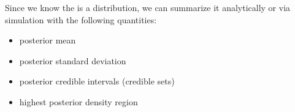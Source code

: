 \documentclass{beamer}
\begin{document}
\begin{frame}
Since we know the  is a 
distribution, we can summarize it analytically or via simulation with
the following quantities:
\pause
\bigskip
\begin{itemize}
\item posterior mean
\pause
\item posterior standard deviation
\pause 
\item posterior credible intervals (credible sets)
\pause
\item highest posterior density region
\end{itemize} 
\end{frame}

\begin{frame}




\begin{figure}[!htp]
\\
\end{figure}
\end{frame}
\end{document}
